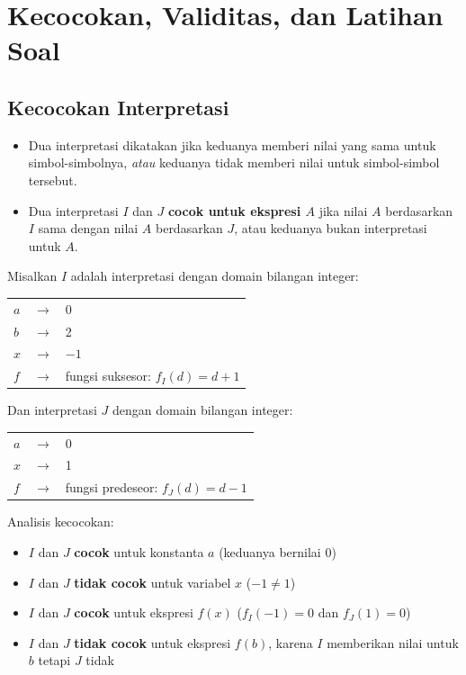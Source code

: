 \section{Kecocokan, Validitas, dan Latihan Soal}

\subsection{Kecocokan Interpretasi}

\begin{konsep}
\begin{itemize}
  \item Dua interpretasi dikatakan  jika keduanya memberi nilai yang sama untuk simbol-simbolnya, \emph{atau} keduanya tidak memberi nilai untuk simbol-simbol tersebut.
  \item Dua interpretasi $I$ dan $J$ \textbf{cocok untuk ekspresi $A$} jika nilai $A$ berdasarkan $I$ sama dengan nilai $A$ berdasarkan $J$, atau keduanya bukan interpretasi untuk $A$.
\end{itemize}
\end{konsep}

\begin{contoh}
Misalkan $I$ adalah interpretasi dengan domain bilangan integer:
\begin{center}
\begin{tabular}{lcl}
  $a$ & $\rightarrow$ & 0 \\
  $b$ & $\rightarrow$ & 2 \\
  $x$ & $\rightarrow$ & $-1$ \\
  $f$ & $\rightarrow$ & fungsi suksesor: $f_I(d) = d + 1$
\end{tabular}
\end{center}

Dan interpretasi $J$ dengan domain bilangan integer:
\begin{center}
\begin{tabular}{lcl}
  $a$ & $\rightarrow$ & 0 \\
  $x$ & $\rightarrow$ & 1 \\
  $f$ & $\rightarrow$ & fungsi predeseor: $f_J(d) = d - 1$
\end{tabular}
\end{center}

Analisis kecocokan:
\begin{itemize}
  \item $I$ dan $J$ \textbf{cocok} untuk konstanta $a$ (keduanya bernilai 0)
  \item $I$ dan $J$ \textbf{tidak cocok} untuk variabel $x$ ($-1 \neq 1$)
  \item $I$ dan $J$ \textbf{cocok} untuk ekspresi $f(x)$ ($f_I(-1) = 0$ dan $f_J(1) = 0$)
  \item $I$ dan $J$ \textbf{tidak cocok} untuk ekspresi $f(b)$, karena $I$ memberikan nilai untuk $b$ tetapi $J$ tidak
\end{itemize}
\end{contoh}

